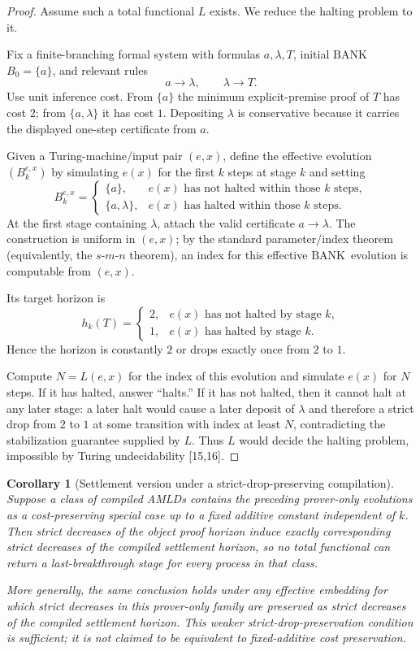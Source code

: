 \documentclass[11pt]{article}
\newtheorem{corollary}[theorem]{Corollary}
\theoremstyle{definition}
\newcommand{\BANK}{\ensuremath{\mathrm{BANK}}}
\begin{document}
\begin{proof}
Assume such a total functional $L$ exists. We reduce the halting problem to it.

Fix a finite-branching formal system with formulas $a,\lambda,T$, initial \BANK\ $B_0=\{a\}$, and relevant rules
\[
a\longrightarrow\lambda,
\qquad
\lambda\longrightarrow T.
\]
Use unit inference cost. From $\{a\}$ the minimum explicit-premise proof of $T$ has cost $2$; from $\{a,\lambda\}$ it has cost $1$. Depositing $\lambda$ is conservative because it carries the displayed one-step certificate from $a$.

Given a Turing-machine/input pair $(e,x)$, define the effective evolution $(B_k^{e,x})$ by simulating $e(x)$ for the first $k$ steps at stage $k$ and setting
\[
B_k^{e,x}=\begin{cases}
\{a\}, & e(x)\text{ has not halted within those }k\text{ steps},\\
\{a,\lambda\}, & e(x)\text{ has halted within those }k\text{ steps}.
\end{cases}
\]
At the first stage containing $\lambda$, attach the valid certificate $a\to\lambda$. The construction is uniform in $(e,x)$; by the standard parameter/index theorem (equivalently, the $s$-$m$-$n$ theorem), an index for this effective \BANK\ evolution is computable from $(e,x)$.

Its target horizon is
\[
h_k(T)=\begin{cases}
2, & e(x)\text{ has not halted by stage }k,\\
1, & e(x)\text{ has halted by stage }k.
\end{cases}
\]
Hence the horizon is constantly $2$ or drops exactly once from $2$ to $1$.

Compute $N=L(e,x)$ for the index of this evolution and simulate $e(x)$ for $N$ steps. If it has halted, answer ``halts.'' If it has not halted, then it cannot halt at any later stage: a later halt would cause a later deposit of $\lambda$ and therefore a strict drop from $2$ to $1$ at some transition with index at least $N$, contradicting the stabilization guarantee supplied by $L$. Thus $L$ would decide the halting problem, impossible by Turing undecidability [15,16].
\end{proof}

\begin{corollary}[Settlement version under a strict-drop-preserving compilation]
Suppose a class of compiled AMLDs contains the preceding prover-only evolutions as a cost-preserving special case up to a fixed additive constant independent of $k$. Then strict decreases of the object proof horizon induce exactly corresponding strict decreases of the compiled settlement horizon, so no total functional can return a last-breakthrough stage for every process in that class.

More generally, the same conclusion holds under any effective embedding for which strict decreases in this prover-only family are preserved as strict decreases of the compiled settlement horizon. This weaker strict-drop-preservation condition is sufficient; it is not claimed to be equivalent to fixed-additive cost preservation.
\end{corollary}
\end{document}
